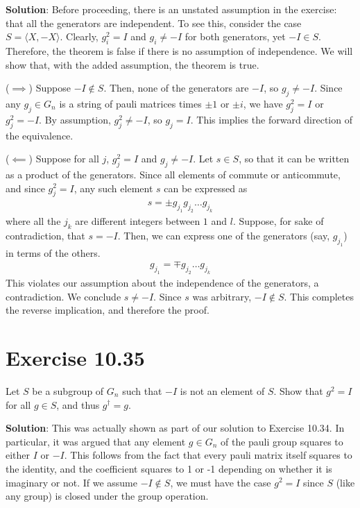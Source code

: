 \documentclass{book}
\begin{document}
    \textbf{Solution}: Before proceeding, there is an unstated assumption in the exercise: that all the generators are independent. To see this, consider the case $S = \langle X, -X \rangle$. Clearly, $g_i^2 = I$ and $g_i \neq -I$ for both generators, yet $-I \in S$. Therefore, the theorem is false if there is no assumption of independence. We will show that, with the added assumption, the theorem is true.
    
    ($\implies$) Suppose $-I \notin S$. Then, none of the generators are $-I$, so $g_j \neq -I$. Since any $g_j \in G_n$ is a string of pauli matrices times $\pm 1$ or $\pm i$, we have $g_j^2 = I$ or $g_j^2 = -I$. By assumption, $g_j^2 \neq -I$, so $g_j = I$. This implies the forward direction of the equivalence.
    
    ($\impliedby$) Suppose for all $j$, $g_j^2 = I$ and $g_j \neq -I$. Let $s \in S$, so that it can be written as a product of the generators. Since all elements of commute or anticommute, and since $g_j^2 = I$, any such element $s$ can be expressed as 
    \begin{align}
        s = \pm g_{j_1}g_{j_2}\dots g_{j_k}
    \end{align}
    where all the $j_k$ are different integers between $1$ and $l$. Suppose, for sake of contradiction, that $s = -I$. Then, we can express one of the generators (say, $g_{j_1}$) in terms of the others.
    \begin{align}
        g_{j_1} = \mp g_{j_2}\dots g_{j_k}
    \end{align}
    This violates our assumption about the independence of the generators, a contradiction. We conclude $s \neq -I$. Since $s$ was arbitrary, $-I \notin S$. This completes the reverse implication, and therefore the proof.
    
\section*{Exercise 10.35}
    Let $S$ be a subgroup of $G_n$ such that $-I$ is not an element of $S$. Show that $g^2 =I$ for all $g\in S$, and thus $g^\dagger = g$.
    
    \textbf{Solution}: This was actually shown as part of our solution to Exercise 10.34. In particular, it was argued that any element $g \in G_n$ of the pauli group squares to either $I$ or $-I$. This follows from the fact that every pauli matrix itself squares to the identity, and the coefficient squares to 1 or -1 depending on whether it is imaginary or not. If we assume $-I\notin S$, we must have the case $g^2 = I$ since $S$ (like any group) is closed under the group operation. 
    
\end{document}
